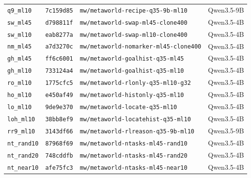 \begin{longtable}{@{}llll@{}}
\texttt{q9\_ml10} & \texttt{7c159d85} & \texttt{mw/metaworld-recipe-q35-9b-ml10} & Qwen3.5-9B \\
\texttt{sw\_ml45} & \texttt{d798811f} & \texttt{mw/metaworld-swap-ml45-clone400} & Qwen3.5-4B \\
\texttt{sw\_ml10} & \texttt{eab8277a} & \texttt{mw/metaworld-swap-ml10-clone400} & Qwen3.5-4B \\
\texttt{nm\_ml45} & \texttt{a7d3270c} & \texttt{mw/metaworld-nomarker-ml45-clone400} & Qwen3.5-4B \\
\texttt{gh\_ml45} & \texttt{ff6c6001} & \texttt{mw/metaworld-goalhist-q35-ml45} & Qwen3.5-4B \\
\texttt{gh\_ml10} & \texttt{733124a4} & \texttt{mw/metaworld-goalhist-q35-ml10} & Qwen3.5-4B \\
\texttt{ro\_ml10} & \texttt{1775cfc5} & \texttt{mw/metaworld-rlonly-q35-ml10-g32} & Qwen3.5-4B \\
\texttt{ho\_ml10} & \texttt{e450af49} & \texttt{mw/metaworld-histonly-q35-ml10} & Qwen3.5-4B \\
\texttt{lo\_ml10} & \texttt{9de9e370} & \texttt{mw/metaworld-locate-q35-ml10} & Qwen3.5-4B \\
\texttt{loh\_ml10} & \texttt{38bb8ef9} & \texttt{mw/metaworld-locatehist-q35-ml10} & Qwen3.5-4B \\
\texttt{rr9\_ml10} & \texttt{3143df66} & \texttt{mw/metaworld-rlreason-q35-9b-ml10} & Qwen3.5-9B \\
\texttt{nt\_rand10} & \texttt{87968f69} & \texttt{mw/metaworld-ntasks-ml45-rand10} & Qwen3.5-4B \\
\texttt{nt\_rand20} & \texttt{748cddfb} & \texttt{mw/metaworld-ntasks-ml45-rand20} & Qwen3.5-4B \\
\texttt{nt\_near10} & \texttt{afe75fc3} & \texttt{mw/metaworld-ntasks-ml45-near10} & Qwen3.5-4B \\
\bottomrule
\end{longtable}
